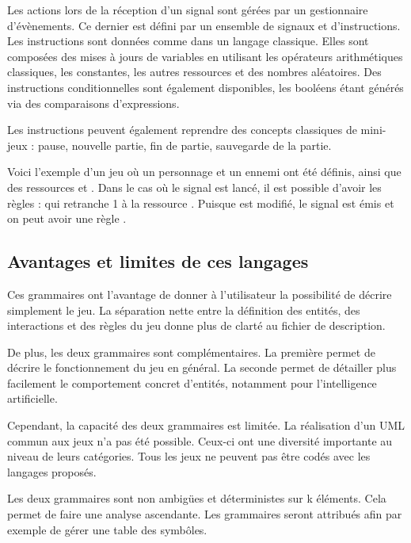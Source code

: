 Les actions lors de la réception d'un signal sont gérées par un gestionnaire d'évènements.
Ce dernier est défini par un ensemble de signaux et d'instructions.
Les instructions sont données comme dans un langage classique.
Elles sont composées des mises à jours de variables en utilisant les opérateurs arithmétiques classiques, les constantes, les autres ressources et des nombres
aléatoires.
Des instructions conditionnelles sont également disponibles, les booléens étant générés via des comparaisons d'expressions.

Les instructions peuvent également reprendre des concepts classiques de mini-jeux : pause, nouvelle partie, fin de partie, sauvegarde de la partie.

Voici l'exemple  d'un jeu où un personnage  et un ennemi  ont été définis, ainsi que des ressources  et .
Dans le cas où le signal  est lancé, il est possible d'avoir les règles :
 qui retranche 1 à la ressource .
Puisque  est modifié, le signal  est émis et on peut avoir une règle
.

\subsection{Avantages et limites de ces langages}

Ces grammaires ont l'avantage de donner à l'utilisateur la possibilité de décrire simplement le jeu.
La séparation nette entre la définition des entités, des interactions et des règles du jeu donne plus de clarté au fichier de description.

De plus, les deux grammaires sont complémentaires. La première permet de décrire le fonctionnement du jeu en général. La seconde permet
de détailler plus facilement le comportement concret d'entités, notamment pour l'intelligence artificielle.

\vspace{0.2cm}

Cependant, la capacité des deux grammaires est limitée.
La réalisation d'un UML commun aux jeux n'a pas été possible.
Ceux-ci ont une diversité importante au niveau de leurs catégories.
Tous les jeux ne peuvent pas être codés avec les langages proposés.

\vspace{0.2cm}

Les deux grammaires sont non ambigües et déterministes sur k éléments.
Cela permet de faire une analyse ascendante.
Les grammaires seront attribués afin par exemple de gérer une table des symbôles.
